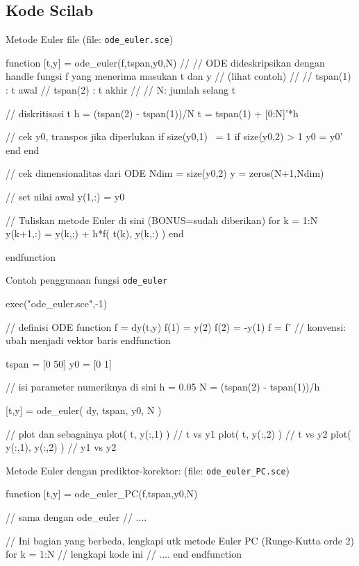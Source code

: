 \documentclass[10pt,bahasa]{article}
\begin{document}
\subsection*{Kode Scilab}

Metode Euler file (file: \texttt{ode\_euler.sce})

\begin{scilabcode}
function [t,y] = ode_euler(f,tspan,y0,N)
  //
  // ODE dideskripsikan dengan handle fungsi f yang menerima masukan t dan y
  // (lihat contoh)
  //
  // tspan(1) : t awal
  // tspan(2) : t akhir
  //
  // N: jumlah selang t
  
  // diskritisasi t
  h = (tspan(2) - tspan(1))/N
  t = tspan(1) + [0:N]'*h
    
  // cek y0, transpos jika diperlukan
  if size(y0,1) ~= 1
    if size(y0,2) > 1
      y0 = y0'
    end
  end
  
  // cek dimensionalitas dari ODE
  Ndim = size(y0,2)
  y = zeros(N+1,Ndim)
    
  // set nilai awal
  y(1,:) = y0
  
  // Tuliskan metode Euler di sini (BONUS=sudah diberikan)
  for k = 1:N
    y(k+1,:) = y(k,:) + h*f( t(k), y(k,:) )
  end
  
endfunction  
\end{scilabcode}

Contoh penggunaan fungsi \verb|ode_euler|

\begin{scilabcode}
exec("ode_euler.sce",-1)

// definisi ODE
function f = dy(t,y)
  f(1) =  y(2)
  f(2) = -y(1)
  f = f'  // konvensi: ubah menjadi vektor baris
endfunction
  
tspan = [0 50]
y0 = [0 1]

// isi parameter numeriknya di sini
h = 0.05
N = (tspan(2) - tspan(1))/h

[t,y] = ode_euler( dy, tspan, y0, N )

// plot dan sebagainya
plot( t, y(:,1) )  // t vs y1
plot( t, y(:,2) )  // t vs y2
plot( y(:,1), y(:,2) ) // y1 vs y2
\end{scilabcode}


Metode Euler dengan prediktor-korektor: (file: \texttt{ode\_euler\_PC.sce})

\begin{scilabcode}
function [t,y] = ode_euler_PC(f,tspan,y0,N)
  
  // sama dengan ode_euler
  // ....

  // Ini bagian yang berbeda, lengkapi utk metode Euler PC (Runge-Kutta orde 2)
  for k = 1:N
    // lengkapi kode ini
    // ....
  end
endfunction
\end{scilabcode}
\end{document}
